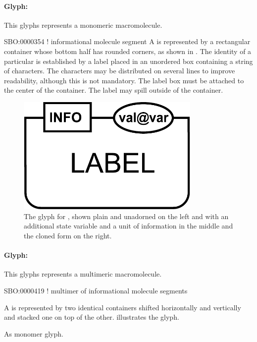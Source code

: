 \paragraph{Glyph: }

This glyphs represents a monomeric macromolecule.

\begin{glyphDescription}
\glyphSboTerm SBO:0000354 !  informational molecule segment
\glyphContainer A  is represented by a rectangular container whose bottom half has rounded corners, as shown in .
\glyphLabel The identity of a particular  is established by a label placed in an unordered box containing a string of characters.  The characters may be distributed on several lines to improve readability, although this is not mandatory.  The label box must be attached to the center of the container.  The label may spill outside of the container.
\end{glyphDescription}


\begin{figure}[htb]
  \centering
  \includegraphics[width = 3.5in]{images/genetic}
  \caption{The \PD glyph for , shown plain and
    unadorned on the left and with an additional state variable and a
    unit of information in the middle and the cloned form on the right.}
  \label{fig:techref:genetic}
\end{figure}

\paragraph{Glyph: }

This glyphs represents a multimeric macromolecule.

\begin{glyphDescription}

\glyphSboTerm SBO:0000419 ! multimer of informational molecule segments

\glyphContainer A  is represented by two identical containers shifted horizontally and vertically and stacked one on top of the other.   illustrates the glyph.

\glyphLabel As monomer glyph.

\end{glyphDescription}

